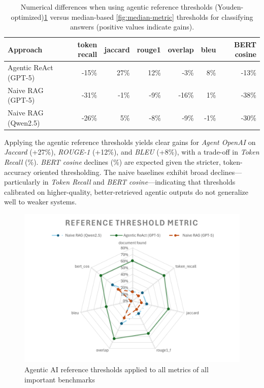 \begin{table}[htbp]
    \centering
    \begin{tabular}{l r r r  r r r}
        \hline
        Approach &  token recall & jaccard & rouge1 & overlap & bleu & \gls{BERT} cosine \\
        \hline
        Agentic ReAct (\gls{GPT}-5) &  -15\% & 27\% & 12\% & -3\% & 8\% & -13\% \\
        Naive \gls{RAG} (\gls{GPT}-5) &  -31\% & -1\% & -9\% & -16\% & 1\% & -38\% \\
        Naive \gls{RAG} (Qwen2.5) &  -26\% & 5\% & -8\% & -9\% & -1\% & -30\% \\
        \hline
    \end{tabular}
    \caption{Numerical differences when using agentic reference thresholds (Youden-optimized)\ref{fig:Youden-metric} versus median-based \ref{fig:median-metric} thresholds for classifying answers (positive values indicate gains).}
    \label{tab:gain-loss-reference-median}
\end{table}

Applying the agentic reference thresholds yields clear gains for \textit{Agent OpenAI} on \textit{Jaccard} (+27\%), \textit{ROUGE-1} (+12\%), and \textit{BLEU} (+8\%), with a trade-off in \textit{Token Recall} (\%). \textit{\gls{BERT} cosine} declines (\%) are expected given the stricter, token-accuracy oriented thresholding. The naive baselines exhibit broad declines—particularly in \textit{Token Recall} and \textit{\gls{BERT} cosine}—indicating that thresholds calibrated on higher-quality, better-retrieved agentic outputs do not generalize well to weaker systems.
\begin{figure}
    \centering
    \includegraphics[width=0.75\linewidth]{Figures/Reference Threshold Metric.png}
    \caption{Agentic AI reference thresholds applied to all metrics of all important benchmarks}\label{fig:Youden-metric}
\end{figure}

